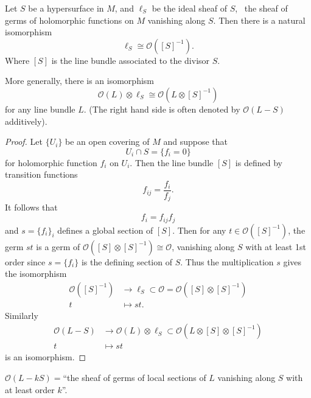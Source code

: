 \documentclass[12pt]{article}
\begin{document}
\begin{lemma}
  Let \(S\) be a hypersurface in \(M\), and \(\ell_S\) be the ideal sheaf of
  \(S\), \ie\ the sheaf of germs of holomorphic functions on \(M\) vanishing
  along \(S\). Then there is a natural isomorphism \[
    \ell_S\cong \mathcal{O}([S]^{-1})
  .\] Where \([S]\) is the line bundle associated to the divisor \(S\).

  More generally, there is an isomorphism \[
    \mathcal{O}(L)\otimes \ell_S\cong \mathcal{O}(L\otimes [S]^{-1})
  \] for any line bundle \(L\). (The right hand side is often denoted by
  \(\mathcal{O}(L-S)\) additively).
\end{lemma}
\begin{proof}
  Let \(\{U_i\}\) be an open covering of \(M\) and suppose that  \[
    U_i\cap S=\{f_i=0\}
  \] for holomorphic function \(f_i\) on \(U_i\). Then the line bundle \([S]\)
  is defined by transition functions \[
    f_{ij}=\frac{f_i}{f_j}
  .\] It follows that \[
    f_{i}=f_{ij}f_j
  \] and \(s=\{f_i\}_i\) defines a global section of \([S]\). Then for any
  \(t\in \mathcal{O}([S]^{-1})\), the germ \(st\) is a germ of \(\mathcal{O}(
  [S]\otimes [S]^{-1})\cong \mathcal{O}\), vanishing along \(S\) with at least
  1st order since \(s=\{f_i\}\) is the defining section of \(S\). Thus the
  multiplication \(s\) gives the isomorphism
  \begin{align*}
    \mathcal{O}([S]^{-1}) &\longrightarrow \ell_S\subset \mathcal{O}=
    \mathcal{O}([S]\otimes [S]^{-1})\\
    t &\longmapsto st
  .\end{align*}
  Similarly 
  \begin{align*}
    \mathcal{O}(L-S) &\longrightarrow \mathcal{O}(L)\otimes\ell_S\subset
    \mathcal{O}(L\otimes [S]\otimes [S]^{-1})\\
    t &\longmapsto st
  \end{align*}
  is an isomorphism.
\end{proof}

\begin{remark}
  \(\mathcal{O}(L-kS)=\)``the sheaf of germs of local sections of \(L\) vanishing
  along \(S\) with at least order \(k\)''.
\end{remark}
\end{document}
